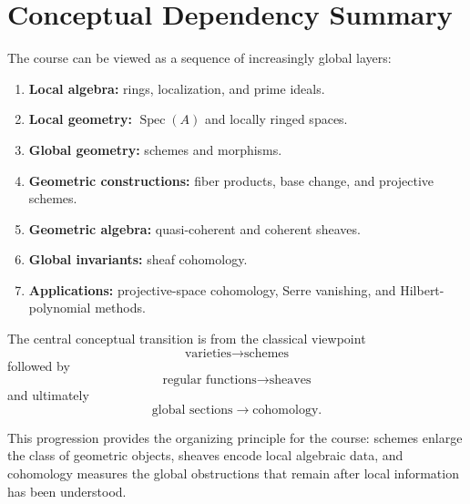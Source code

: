 \documentclass[11pt]{article}
\begin{document}
\section{Conceptual Dependency Summary}

The course can be viewed as a sequence of increasingly global layers:

\begin{enumerate}
    \item \textbf{Local algebra:} rings, localization, and prime ideals.
    \item \textbf{Local geometry:} $\operatorname{Spec}(A)$ and locally ringed spaces.
    \item \textbf{Global geometry:} schemes and morphisms.
    \item \textbf{Geometric constructions:} fiber products, base change, and projective schemes.
    \item \textbf{Geometric algebra:} quasi-coherent and coherent sheaves.
    \item \textbf{Global invariants:} sheaf cohomology.
    \item \textbf{Applications:} projective-space cohomology, Serre vanishing, and Hilbert-polynomial methods.
\end{enumerate}

The central conceptual transition is from the classical viewpoint
\[
\text{varieties} \longrightarrow \text{schemes}
\]
followed by
\[
\text{regular functions} \longrightarrow \text{sheaves}
\]
and ultimately
\[
\text{global sections} \longrightarrow \text{cohomology}.
\]

This progression provides the organizing principle for the course: schemes enlarge the class of geometric objects, sheaves encode local algebraic data, and cohomology measures the global obstructions that remain after local information has been understood.
\end{document}
